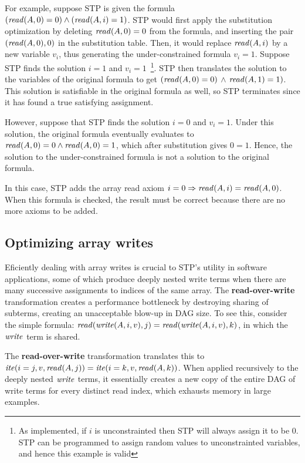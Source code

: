 
For example, suppose STP is given the formula $({\it read}(A, 0) = 0)
\wedge ({\it read}(A, i) = 1)$.  STP would first apply the substitution
optimization by deleting ${\it read}(A, 0) = 0$ from the formula, and
inserting the pair $({\it read}(A, 0), 0)$ in the substitution
table. Then, it would replace ${\it read}(A, i)$ by a new variable
$v_i$, thus generating the under-constrained formula $v_i = 1$.
Suppose STP finds the solution $i = 1$ and $v_i = 1$~\footnote{As
implemented, if $i$ is unconstrainted then STP will always assign it
to be $0$. STP can be programmed to assign random values to
unconstrainted variables, and hence this example is valid}.  STP then
translates the solution to the variables of the original formula to
get $({\it read}(A, 0) = 0)$ $\wedge$ ${\it read}(A, 1) = 1)$.  This
solution is satisfiable in the original formula as well, so STP
terminates since it has found a true satisfying assignment.

However, suppose that STP finds the solution $i = 0$ and $v_i = 1$.
Under this solution, the original formula eventually evaluates to
${\it read}(A,0) = 0 \wedge {\it read}(A, 0) = 1$, which after
substitution gives $0=1$. Hence, the solution to the under-constrained
formula is not a solution to the original formula.

In this case, STP adds the array read axiom $i=0 \Rightarrow
{\it read}(A, i) = {\it read}(A, 0)$.  When this formula is checked, the
result must be correct because there are no more axioms to be added.

\subsection{Optimizing array writes}

Eficiently dealing with array writes is crucial to STP's utility in
software applications, some of which produce deeply nested write terms
when there are many successive assignments to indices of the same array.
The {\bf read-over-write} transformation
creates a performance bottleneck by destroying sharing of subterms,
creating an unacceptable blow-up in DAG size.
To see this, consider the simple formula:
${\it read}({\it write}(A,i,v),j) = {\it read}({\it write}(A,i,v),k)$, in
which the ${\it write}$ term is shared.

The {\bf read-over-write} transformation translates this to
${\it ite}(i=j,v,{\it read}(A,j)) = {\it ite}(i=k,v,{\it read}(A,k))$.  When
applied recursively to the deeply nested ${\it write}$ terms, it
essentially creates a new copy of the entire DAG of write terms for
every distinct read index, which exhausts memory in large examples.

